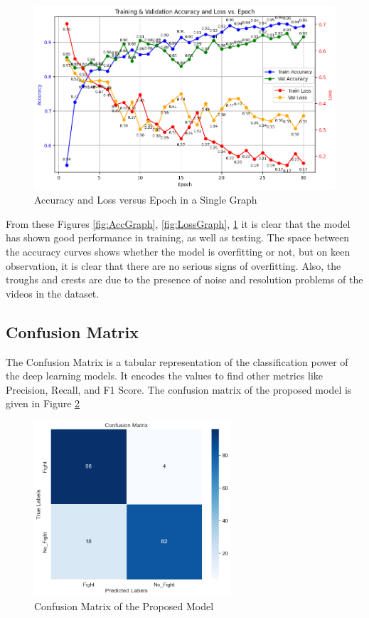 \begin{figure}[htbp]
    \centering
    \includegraphics[width=1\textwidth]{Images/acc_loss_vs_epoch.png}
    \caption{Accuracy and Loss versus Epoch in a Single Graph}
    \label{fig:AccLossGraph}
\end{figure}

\noindent From these Figures \ref{fig:AccGraph}, \ref{fig:LossGraph}, \ref{fig:AccLossGraph} it is clear that the model has shown good performance in training, as well as testing. The space between the accuracy curves shows whether the model is overfitting or not, but on keen observation, it is clear that there are no serious signs of overfitting. Also, the troughs and crests are due to the presence of noise and resolution problems of the videos in the dataset.

\clearpage

\subsection{Confusion Matrix}

The Confusion Matrix is a tabular representation of the classification power of the deep learning models. It encodes the values to find other metrics like Precision, Recall, and F1 Score. The confusion matrix of the proposed model is given in Figure \ref{fig:confMatrix}

\begin{figure}[!htbp]
    \centering \includegraphics[width=0.65\textwidth]{Images/conf_matrix.png}
    \caption{Confusion Matrix of the Proposed Model}
    \label{fig:confMatrix}
\end{figure}

